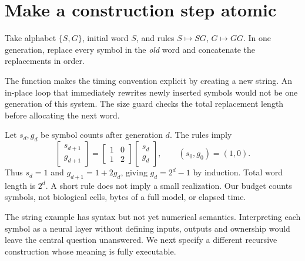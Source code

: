 \section{Make a construction step atomic}
Take alphabet $\{S,G\}$, initial word $S$, and rules
$S\mapsto SG$, $G\mapsto GG$. In one generation, replace every symbol
in the \emph{old} word and concatenate the replacements in order.
\begin{center}\end{center}
The function makes the timing convention explicit by creating a new string.
An in-place loop that immediately rewrites newly inserted symbols would
not be one generation of this system. The size guard checks the total
replacement length before allocating the next word.

Let $s_d,g_d$ be symbol counts after generation $d$. The rules imply
\begin{equation}
 \begin{bmatrix}s_{d+1}\\g_{d+1}\end{bmatrix}
 =\begin{bmatrix}1&0\\1&2\end{bmatrix}
 \begin{bmatrix}s_d\\g_d\end{bmatrix},\qquad (s_0,g_0)=(1,0).
\end{equation}
Thus $s_d=1$ and $g_{d+1}=1+2g_d$, giving $g_d=2^d-1$ by induction.
Total word length is $2^d$. A short rule does not imply a small realization.
Our budget counts symbols, not biological cells, bytes of a full model,
or elapsed time.

The string example has syntax but not yet numerical semantics. Interpreting
each symbol as a neural layer without defining inputs, outputs and ownership
would leave the central question unanswered. We next specify a different
recursive construction whose meaning is fully executable.

